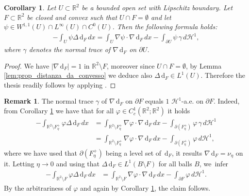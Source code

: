 \documentclass[JEP,XML,SOM,Unicode, NoFloatCountersInSection,published]{cedram}
\newcommand{\R}{\mathbb{R}}
\newcommand{\di}{\,\mathrm{d}}
\newtheorem{cor}[theorem]{Corollary}
\theoremstyle{definition}
\newtheorem{remark}[theorem]{Remark}
\begin{document}
\begin{cor}\label{cor:integration_by_parts}
Let $U\subset\R^2$ be a bounded open set with Lipschitz boundary. Let $F\subset\R^2$ be closed and convex such that $U\cap F=\emptyset$ and let $\psi\in W^{1,1}(U)\cap L^\infty(U)\cap C^0(U)$. Then the following formula holds:
\begin{equation*}
\begin{split}
- \int_{U}\psi\Delta\di_{F}\,dx
=
\int_{U} \nabla\psi\cdot\nabla\di_{F}\,dx- \int_{\partial U}\psi\,\gamma\,d\mathcal{H}^1,
\end{split}
\end{equation*}
where $\gamma$ denotes the normal trace of $\nabla\di_F$ on $\partial U$.
\end{cor}

\begin{proof}
We have $|\nabla \di_F|=1$ in $\R^2\setminus F$, moreover since $U\cap F=\emptyset$, by
Lemma \ref{lem:prop_distanza_da_convesso} we deduce also $\Delta\di_F\in L^1(U)$. Therefore the thesis readily follows by applying \hbox{\cite[Th.\,1.9]{A}}.
\end{proof}

\begin{remark}\label{rem:traccia}
The normal trace $\gamma$ of $\nabla\di_F$ on $\partial F$ equals $1$ $\mathcal H^1$-a.e. on $\partial F$. Indeed, from Corollary \ref{cor:integration_by_parts} we have that for all $\varphi\in C^1_c(\R^2;\R^2)$ it holds
\begin{align}
- \int_{\R^2\setminus F^+_\eta}\varphi\Delta\di_{F}\,dx
&=
\int_{\R^2\setminus F^+_\eta} \nabla\varphi\cdot\nabla\di_{F}\,dx- \int_{\partial(F_\eta^+)}\varphi\,\gamma\,d\mathcal{H}^1\nonumber\\
&=\int_{\R^2\setminus F^+_\eta} \nabla\varphi\cdot\nabla\di_{F}\,dx- \int_{\partial(F_\eta^+)}\varphi\,d\mathcal{H}^1,\nonumber
\end{align}
where we have used that $\partial (F_\eta^+)$ being a level set of $\di_F$, it results $\nabla\di_F=\nu_\eta$ on it.
Letting $\eta\to 0$ and using that $\Delta \di_F\in L^1(B\setminus F)$ for all balls $B$, we~infer
\begin{align}
-\int_{\R^2\setminus F}\varphi\Delta\di_{F}\,dx
&=
\int_{\R^2\setminus F} \nabla\varphi\cdot\nabla\di_{F}\,dx- \int_{\partial F}\varphi\,d\mathcal{H}^1.\nonumber
\end{align}
By the arbitrariness of $\varphi$ and again by Corollary \ref{cor:integration_by_parts}, the claim follows.
\end{remark}
\end{document}
